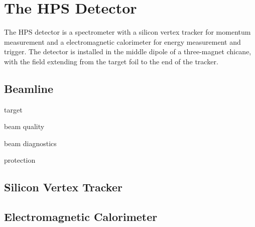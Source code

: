 \chapter{The HPS Detector}

The HPS detector is a spectrometer with a silicon vertex tracker for momentum measurement and a electromagnetic calorimeter for energy measurement and trigger.
The detector is installed in the middle dipole of a three-magnet chicane, with the field extending from the target foil to the end of the tracker.

\section{Beamline}
target

beam quality

beam diagnostics

protection

\section{Silicon Vertex Tracker}

\section{Electromagnetic Calorimeter}
